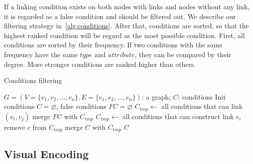 If a linking condition exists on both nodes with links and nodes without any link, it is regarded as a false condition and should be filtered out.
We describe our filtering strategy in~\ref{alg:conditions}.
After that, conditions are sorted, so that the highest ranked condition will be regard as the most possible condition.
First, all conditions are sorted by their frequency.
If two conditions with the same frequency have the same $type$ and $attribute$, they can be compared by their degree.
More stronger conditions are ranked higher than others.





\begin{algorithm}[!t]
    \renewcommand\arraystretch{1.2}
    \caption{ Conditions filtering }
    \label{alg:conditions}
    \begin{algorithmic}[1]
        \Require
            $G=(V=\{v_1, v_2, ..., v_n\}, E=\{e_1, e_2, ..., e_n\})$: a graph;
        \Ensure
            $C$: conditions
        \State Init conditions $C=\varnothing$, false conditions $FC=\varnothing$
                \State $C_{tmp} \gets$ all conditions that can link $(v_i, v_j)$
                \State merge $FC$ with $C_{tmp}$
            \EndIf
        \EndFor
            \State $C_{tmp} \gets$ all conditions that can construct link $e_i$
                    \State remove $c$ from $C_{tmp}$
                \EndIf
            \EndFor
            \State merge $C$ with $C_{tmp}$
        \EndFor
        \State \Return $C$
    \end{algorithmic}
\end{algorithm}


\subsection{Visual Encoding}

